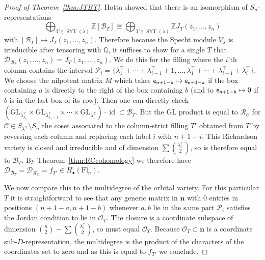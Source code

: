\documentclass[11pt]{amsart}
\theoremstyle{definition}
\numberwithin{equation}{section}
\newcommand{\idem}{\operatorname{id}} %
\newcommand{\fl}[1]{\mathrm{Fl}_{#1}}
\newcommand{\GL}{\mathrm{GL}}
\newcommand{\syt}{\operatorname{SYT}} %
\begin{document}
\begin{proof}[Proof of Theorem~\ref{thm:JTBT}]
    Hotta \cite{Ho84} showed that there is an isomorphism of $S_n$-representations
    $$\bigoplus_{T\in \syt(\lambda)}\mathbb{Z}[\mathcal{B}_T]\cong \bigoplus_{T\in \syt(\lambda)}\mathbb{Z}J_T(z_1,\ldots,z_n)$$
    with $[\mathcal{B}_T]\mapsto J_T(z_1,\ldots,z_n)$. Therefore because the Specht module $V_\lambda$ is irreducible after tensoring with $\mathbb{Q}$, it suffices to show for a single $T$ that $\mathcal{D}_{\mathcal{B}_T}(z_1,\ldots,z_n)=J_T(z_1,\ldots,z_n)$. We do this for the filling where the $i$'th column contains the interval $\mathcal{P}_i=\{\lambda_1^{\top}+\cdots+\lambda_{i-1}^{\top}+1,\ldots,\lambda_1^{\top}+\cdots+\lambda_{i-1}^{\top}+\lambda_{i}^{\top}\}$. We choose the nilpotent matrix $M$ which takes $\sf{e}_{n+1-b}\mapsto \sf{e}_{n+1-a}$ if the box containing $a$ is directly to the right of the box containing $b$ (and to $\sf{e}_{n+1-b}\mapsto 0$ if $b$ is in the last box of its row). Then one can directly check $(\GL_{\lambda^{\top}_{\lambda_1}}\times\GL_{\lambda^{\top}_{\lambda_1-1}}\times \cdots \times \GL_{\lambda^{\top}_1})\cdot \idem\subset \mathcal{B}_T$. But the $\GL$ product is equal to $\mathcal{R}_{\mathcal{C}}$ for $\mathcal{C}\in S_{\lambda^{\top}}\setminus S_n$ the coset associated to the column-strict filling $T'$ obtained from $T$ by reversing each column and replacing each label $i$ with $n+1-i$. This Richardson variety is closed and irreducible and of dimension $\sum \binom{\lambda_i^{\top}}{2}$, so is therefore equal to $\mathcal{B}_T$. By Theorem~\ref{thm:RCcohomology} we therefore have
$\mathcal{D}_{\mathcal{B}_T}=\mathcal{D}_{\mathcal{R}_{\mathcal{C}}}=f_{T'}\in H_\bullet(\fl{n}).$

We now compare this to the multidegree of the orbital variety.
For this particular $T$ it is straightforward to see that any generic matrix in $\bm{n}$ with $0$ entries in positions $(n+1-a,n+1-b)$ whenever $a,b$ lie in the same part $\mathcal{P}_i$ satisfies the Jordan condition to lie in $\mathcal{O}_T$.
The closure is a coordinate subspace of dimension $\binom{n}{2}-\sum \binom{\lambda_i^{\top}}{2}$, so must equal  $\mathcal{O}_T$. Because $\mathcal{O}_T\subset \bm{n}$ is a coordinate sub-$D$-representation, the multidegree is the product of the characters of the coordinates set to zero \cite{MiSt05} and as this is equal to $f_{T'}$ we conclude.
\end{proof}
\end{document}
